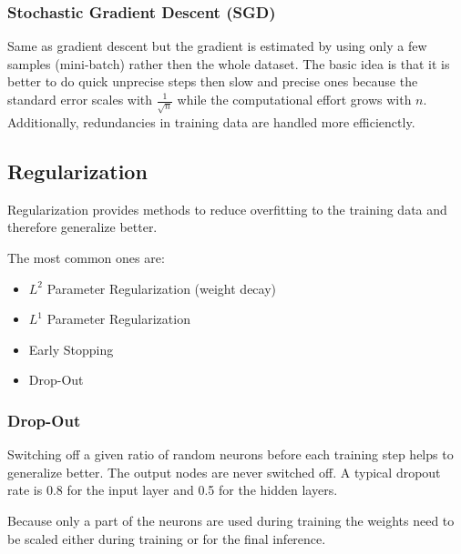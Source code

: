 
\subsubsection{Stochastic Gradient Descent (SGD)}

Same as gradient descent but the gradient is estimated by using only a few samples (mini-batch) rather then the whole dataset.
The basic idea is that it is better to do quick unprecise steps then slow and precise ones because the standard error scales with $\frac{1}{\sqrt{n}}$ while the computational effort grows with $n$.
Additionally, redundancies in training data are handled more efficienctly.

\subsection{Regularization}

Regularization provides methods to reduce overfitting to the training data and therefore generalize better.

The most common ones are:
\begin{itemize}
    \item $L^2$ Parameter Regularization (weight decay)
    \item $L^1$ Parameter Regularization
    \item Early Stopping
    \item Drop-Out
\end{itemize}

\subsubsection{Drop-Out}

Switching off a given ratio of random neurons before each training step helps to generalize better. The output nodes are never switched off. A typical dropout rate is 0.8 for the input layer and 0.5 for the hidden layers.

\newpar{}

Because only a part of the neurons are used during training the weights need to be scaled either during training or for the final inference.

